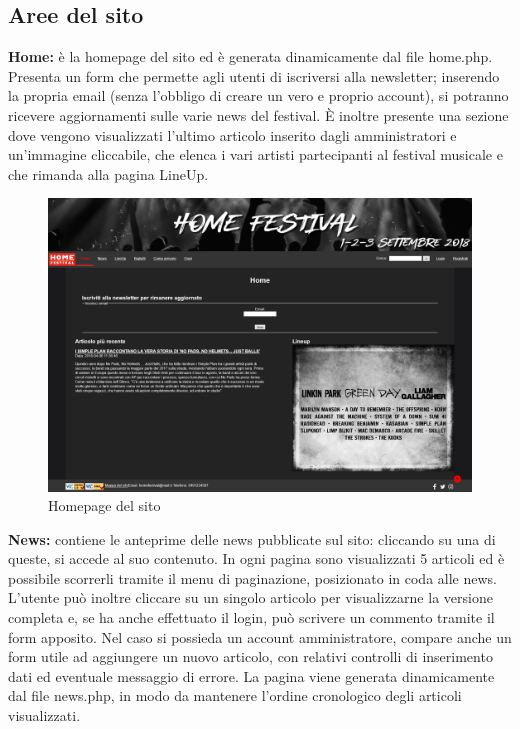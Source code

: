 \documentclass[10pt, a4paper]{article}
\begin{document}
\subsection{Aree del sito}
\textbf{Home: }è la homepage del sito ed è generata dinamicamente dal file home.php. Presenta un form che permette agli utenti di iscriversi alla newsletter; inserendo la propria email (senza l'obbligo di creare un vero e proprio account), si potranno ricevere aggiornamenti sulle varie news del festival. È inoltre presente una sezione dove vengono visualizzati l'ultimo articolo inserito dagli amministratori e un'immagine cliccabile, che elenca i vari artisti partecipanti al festival musicale e che rimanda alla pagina LineUp.
\begin{figure}[h!]
  \centering
  \includegraphics[width=1\textwidth]{Images/homepage.png}
  \caption{Homepage del sito}
  \label{fig:homepage}
\end{figure}
\begin{flushleft} \textbf{News: }contiene le anteprime delle news pubblicate sul sito: cliccando su una di queste, si accede al suo contenuto. In ogni pagina sono visualizzati 5 articoli ed è possibile scorrerli tramite il menu di paginazione, posizionato in coda alle news. L'utente può inoltre cliccare su un singolo articolo per visualizzarne la versione completa e, se ha anche effettuato il login, può scrivere un commento tramite il form apposito. Nel caso si possieda un account amministratore, compare anche un form utile ad aggiungere un nuovo articolo, con relativi controlli di inserimento dati ed eventuale messaggio di errore. La pagina viene generata dinamicamente dal file news.php, in modo da mantenere l'ordine cronologico degli articoli visualizzati.\end{flushleft}
\end{document}
